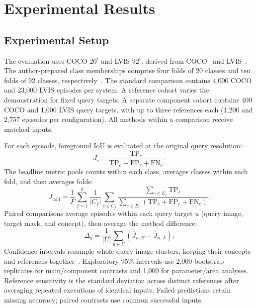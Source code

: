 \section{Experimental Results}
\subsection{Experimental Setup}
\label{sec:setup}
The evaluation uses COCO-$20^i$ and LVIS-$92^i$, derived from COCO~\cite{coco} and LVIS~\cite{lvis}. The author-prepared class memberships comprise four folds of 20 classes and ten folds of 92 classes, respectively~\cite{matcher}. The standard comparison contains 4,000 COCO and 23,000 LVIS episodes per system. A reference cohort varies the demonstration for fixed query targets. A separate component cohort contains 400 COCO and 1,000 LVIS query targets, with up to three references each (1,200 and 2,757 episodes per configuration). All methods within a comparison receive matched inputs.

For each episode, foreground IoU is evaluated at the original query resolution:
\begin{equation}
    J_e=\frac{\mathrm{TP}_e}{\mathrm{TP}_e+\mathrm{FP}_e+\mathrm{FN}_e}.
\end{equation}
The headline metric pools counts within each class, averages classes within each fold, and then averages folds:
\begin{equation}
    J_{\mathrm{fold}}=\frac{1}{F}\sum_{f=1}^{F}\frac{1}{|C_f|}
    \sum_{c\in C_f}\frac{\sum_{e\in E_c}\mathrm{TP}_e}
    {\sum_{e\in E_c}(\mathrm{TP}_e+\mathrm{FP}_e+\mathrm{FN}_e)}.
    \label{eq:pooled}
\end{equation}
Paired comparisons average episodes within each query target $u$ (query image, target mask, and concept), then average the method difference:
\begin{equation}
    \Delta_q=\frac{1}{|U|}\sum_{u\in U}
    \left(\overline J_{u,B}-\overline J_{u,A}\right).
    \label{eq:paired}
\end{equation}
Confidence intervals resample whole query-image clusters, keeping their concepts and references together~\cite{bootstrap,clusterbootstrap}. Exploratory 95\% intervals use 2,000 bootstrap replicates for main/component contrasts and 1,000 for parameter/area analyses. Reference sensitivity is the standard deviation across distinct references after averaging repeated executions of identical inputs. Failed predictions retain missing accuracy; paired contrasts use common successful inputs.

